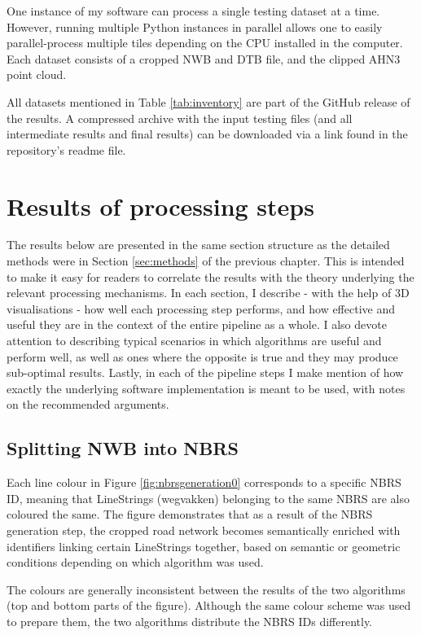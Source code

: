 One instance of my software can process a single testing dataset at a time. However, running multiple Python instances in parallel allows one to easily parallel-process multiple tiles depending on the CPU installed in the computer. Each dataset consists of a cropped NWB and DTB file, and the clipped AHN3 point cloud.

All datasets mentioned in Table \ref{tab:inventory} are part of the GitHub release of the results. A compressed archive with the input testing files (and all intermediate results and final results) can be downloaded via a link found in the repository's readme file.

\section{Results of processing steps}
\label{sec:results}

The results below are presented in the same section structure as the detailed methods were in Section \ref{sec:methods} of the previous chapter. This is intended to make it easy for readers to correlate the results with the theory underlying the relevant processing mechanisms. In each section, I describe - with the help of 3D visualisations - how well each processing step performs, and how effective and useful they are in the context of the entire pipeline as a whole. I also devote attention to describing typical scenarios in which algorithms are useful and perform well, as well as ones where the opposite is true and they may produce sub-optimal results. Lastly, in each of the pipeline steps I make mention of how exactly the underlying software implementation is meant to be used, with notes on the recommended arguments.

\subsection{Splitting NWB into NBRS}
\label{sub:r_nbrsgeneration}

Each line colour in Figure \ref{fig:nbrsgeneration0} corresponds to a specific NBRS ID, meaning that LineStrings (wegvakken) belonging to the same NBRS are also coloured the same. The figure demonstrates that as a result of the NBRS generation step, the cropped road network becomes semantically enriched with identifiers linking certain LineStrings together, based on semantic or geometric conditions depending on which algorithm was used.

The colours are generally inconsistent between the results of the two algorithms (top and bottom parts of the figure). Although the same colour scheme was used to prepare them, the two algorithms distribute the NBRS IDs differently.

